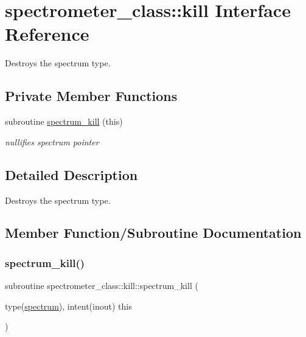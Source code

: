 \hypertarget{interfacespectrometer__class_1_1kill}{}\section{spectrometer\+\_\+class\+:\+:kill Interface Reference}
\label{interfacespectrometer__class_1_1kill}


Destroys the spectrum type.  


\subsection*{Private Member Functions}
\begin{DoxyCompactItemize}
\item 
subroutine \hyperlink{interfacespectrometer__class_1_1kill_a260b2c75028e2be65c788d31a47b9174}{spectrum\+\_\+kill} (this)
\begin{DoxyCompactList}\small\item\em nullifies spectrum pointer \end{DoxyCompactList}\end{DoxyCompactItemize}


\subsection{Detailed Description}
Destroys the spectrum type. 

\subsection{Member Function/\+Subroutine Documentation}
\mbox{\label{interfacespectrometer__class_1_1kill_a260b2c75028e2be65c788d31a47b9174}} 
\subsubsection{\texorpdfstring{spectrum\+\_\+kill()}{spectrum\_kill()}}
{\footnotesize\ttfamily subroutine spectrometer\+\_\+class\+::kill\+::spectrum\+\_\+kill (\begin{DoxyParamCaption}\item[{type(\hyperlink{structspectrometer__class_1_1spectrum}{spectrum}), intent(inout)}]{this }\end{DoxyParamCaption})\hspace{0.3cm}{\ttfamily [private]}}



